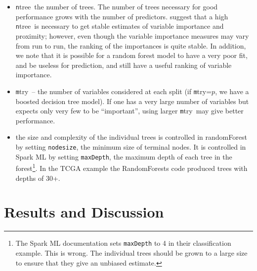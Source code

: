 \documentclass[10pt,letterpaper]{article}
\newcommand{\mtry}{{\texttt mtry}}
\newcommand{\ntree}{{\texttt ntree}}
\begin{document}
\begin{itemize}
\item \ntree\ the number of trees.  The number of trees necessary for good performance grows with the number of predictors.
\cite{Liaw.and.Weiner.2002} suggest that a high \ntree\ is necessary to get stable
  estimates of variable importance and proximity; however, even though the variable importance measures may vary from run to run,
  the ranking of the importances is quite stable.  In addition, we note that it is possible for a random forest model to have a very poor
  fit, and be useless for prediction, and still have a useful ranking of variable importance.
\item \mtry\ -- the number of variables considered at each split (if \mtry=$p$, we have a boosted decision
  tree model).  If one has a very large number of variables but expects only very few to be ``important'', using larger \mtry\ may give
  better performance.
\item the size and complexity of the individual trees is controlled in {\sc randomForest} by setting \texttt{nodesize}, the
  minimum size of terminal nodes. It is controlled in Spark ML by setting \texttt{maxDepth}, the maximum depth of each
  tree in the forest\footnote{The Spark ML documentation \cite[]{Spark.2016} sets \texttt{maxDepth}
    to 4 in their classification example. This is wrong. The
    individual trees should be grown to a large size to ensure that
    they give an unbiased estimate.}.
  In the TCGA example the RandomForests code produced trees with depths of 30+. 
\end{itemize}


%
%
\section{Results and Discussion}



\end{document}
